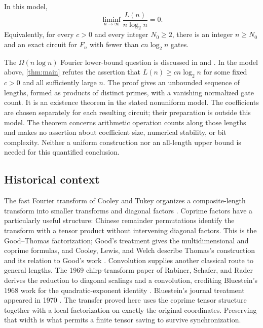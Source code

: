 \begin{theorem}\label{thm:main}
In this model,
\[
 \liminf_{n\to\infty}\frac{L(n)}{n\log_2 n}=0.
\]
Equivalently, for every $c>0$ and every integer $N_0\ge2$, there is an
integer $n\ge N_0$ and an exact circuit for $F_n$ with fewer than
$c n\log_2 n$ gates.
\end{theorem}

The $\Omega(n\log n)$ Fourier lower-bound question is discussed in
\citet[Abstract]{ailon2013} and \citet[Section~1]{almanRao2023}.
In the model above, \cref{thm:main} refutes the assertion that
$L(n)\ge c n\log_2 n$ for some fixed $c>0$ and all sufficiently large $n$.
The proof gives an unbounded sequence of
lengths, formed as products of distinct primes, with a vanishing
normalized gate count. It is an existence theorem in the stated
nonuniform model. The coefficients are chosen separately for each
resulting circuit; their preparation is outside this model. The theorem
concerns arithmetic operation counts along those lengths and makes no
assertion about coefficient size, numerical stability, or bit complexity.
Neither a uniform construction nor an all-length upper bound is needed
for this quantified conclusion.

\subsection{Historical context}

The fast Fourier transform of Cooley and Tukey organizes a composite-length
transform into smaller transforms and diagonal factors
\citep{cooleyTukey1965}. Coprime factors have a particularly useful
structure: Chinese remainder permutations identify the transform with a
tensor product without intervening diagonal factors. This is the
Good--Thomas factorization; Good's treatment gives the multidimensional
and coprime formulas, and Cooley, Lewis, and Welch describe Thomas's
construction and its relation to Good's work
\citep[Sections~11--12]{good1958}
\citep[pp.~1675--1677]{cooleyLewisWelch1967}.
Convolution supplies another classical route to general lengths.
The 1969 chirp-transform paper of Rabiner, Schafer, and Rader derives
the reduction to diagonal scalings and a convolution, crediting
Bluestein's 1968 work for the quadratic-exponent identity
\citep[Section~II]{rabinerSchaferRader1969}. Bluestein's journal treatment
appeared in 1970 \citep{bluestein1970}.
The transfer proved here uses the coprime tensor structure together with
a local factorization on exactly the original coordinates. Preserving
that width is what permits a finite tensor saving to survive synchronization.

